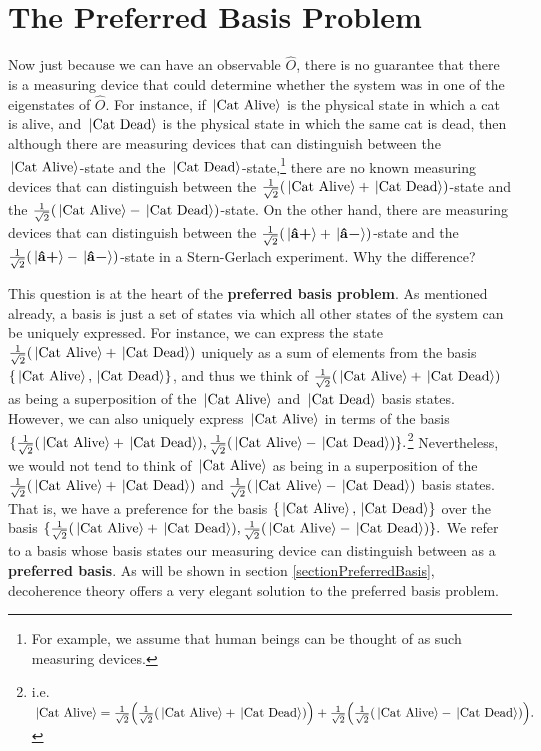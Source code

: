 \section{The Preferred Basis Problem\protect\footnotemark}
Now just because we can have an observable $\hat{O}$, there is no guarantee that there is a measuring device that could determine whether the system was in one of the eigenstates of $\hat{O}$. For instance, if $\ket*{\text{Cat Alive}}$ is the physical state in which a cat is alive, and $\ket*{\text{Cat Dead}}$ is the physical state in which the same cat is dead, then although there are measuring devices that can distinguish between the $\ket*{\text{Cat Alive}}$-state and the $\ket*{\text{Cat Dead}}$-state,\footnote{For example, we assume that human beings can be thought of as such measuring devices.} there are no known measuring devices that can distinguish between the $\frac{1}{\sqrt{2}}(\ket*{\text{Cat Alive}}+\ket*{\text{Cat Dead}})$-state and the $\frac{1}{\sqrt{2}}(\ket*{\text{Cat Alive}}-\ket*{\text{Cat Dead}})$-state. On the other hand, there are measuring devices that can distinguish between the $\frac{1}{\sqrt{2}}(\ket*{{\vb{\hat{{a}}}\bm{+}}}+\ket*{{\vb{\hat{{a}}}\bm{-}}})$-state and the $\frac{1}{\sqrt{2}}(\ket*{{\vb{\hat{{a}}}\bm{+}}}-\ket*{{\vb{\hat{{a}}}\bm{-}}})$-state in a Stern-Gerlach experiment. Why the difference?

This question is at the heart of the \textbf{preferred basis problem}. As mentioned already, a basis is just a set of states via which all other states of the system can be uniquely expressed. For instance, we can express the state $\frac{1}{\sqrt{2}}(\ket*{\text{Cat Alive}}+\ket*{\text{Cat Dead}})$ uniquely as a sum of elements from the basis $\{\ket*{\text{Cat Alive}}, \ket*{\text{Cat Dead}}\}$, and thus we think of $\frac{1}{\sqrt{2}}(\ket*{\text{Cat Alive}}+\ket*{\text{Cat Dead}})$ as being a superposition of the $\ket*{\text{Cat Alive}}$ and $\ket*{\text{Cat Dead}}$ basis states. However, we can also uniquely express  $\ket*{\text{Cat Alive}}$ in terms of the basis $\{\frac{1}{\sqrt{2}}(\ket*{\text{Cat Alive}}+\ket*{\text{Cat Dead}}), \frac{1}{\sqrt{2}}(\ket*{\text{Cat Alive}}-\ket*{\text{Cat Dead}})\}.$\footnote{i.e. $\ket*{\text{Cat Alive}}= \frac{1}{\sqrt{2}}\Big(\frac{1}{\sqrt{2}}(\ket*{\text{Cat Alive}}+\ket*{\text{Cat Dead}})\Big)+\frac{1}{\sqrt{2}}\Big( \frac{1}{\sqrt{2}}(\ket*{\text{Cat Alive}}-\ket*{\text{Cat Dead}})\Big). $} Nevertheless, we would not tend to think of $\ket*{\text{Cat Alive}}$ as being in a superposition of the $\frac{1}{\sqrt{2}}(\ket*{\text{Cat Alive}}+\ket*{\text{Cat Dead}}) $ and $\frac{1}{\sqrt{2}}(\ket*{\text{Cat Alive}}-\ket*{\text{Cat Dead}})$ basis states. That is, we have a preference for the basis $\{\ket*{\text{Cat Alive}}, \ket*{\text{Cat Dead}}\}$ over the basis $\{\frac{1}{\sqrt{2}}(\ket*{\text{Cat Alive}}+\ket*{\text{Cat Dead}}), \frac{1}{\sqrt{2}}(\ket*{\text{Cat Alive}}-\ket*{\text{Cat Dead}})\}.$ We refer to a basis whose basis states our measuring device can distinguish between as a \textbf{preferred basis}. As will be shown in section \ref{sectionPreferredBasis}, decoherence theory offers a very elegant solution to the preferred basis problem. 
